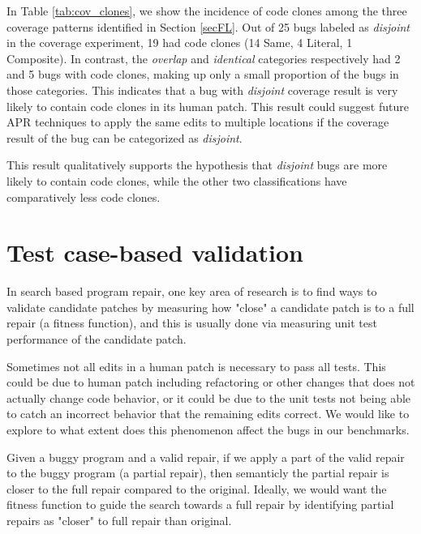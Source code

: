 \documentclass[sigconf, timestamp-false, anonymous=true]{acmart}
\newcommand\todo[1]{\textcolor{red}{#1}}
\begin{document}
In Table \ref{tab:cov_clones}, we show the incidence of code clones among the three 
coverage patterns identified in Section \ref{secFL}. Out of 25 bugs labeled as 
\emph{disjoint} in the coverage 
experiment, 19 had code clones (14 Same, 4 Literal, 1 Composite). In contrast, the 
\emph{overlap} and \emph{identical} categories respectively had 2 and 5 bugs with code clones, 
making up only a small proportion of the bugs in those categories. This indicates that a 
bug with \emph{disjoint} coverage result is very likely to contain code clones in its
human patch. This result could suggest future APR techniques to apply the same edits to multiple locations
if the coverage result of the bug can be categorized as \emph{disjoint}.

This result qualitatively supports the hypothesis that \emph{disjoint} bugs are more likely to contain code 
clones, while the other two classifications have comparatively less code clones.



\section{Test case-based validation}

In search based program repair, one key area of research is to find ways to validate
candidate patches by
measuring how "close" a candidate patch is to a full repair (a fitness function),
and this is usually done via measuring unit test performance of the candidate patch. 


Sometimes not all edits in a human patch is necessary to pass all tests. This could be
due to human patch including refactoring or other changes that does not actually
change code behavior, or it could be due to the unit tests not being able to catch
an incorrect behavior that the remaining edits correct. We would like to explore
to what extent does this phenomenon affect the bugs in our benchmarks.


Given a buggy program and a valid repair, if we apply a part of the valid repair to 
the buggy program (a partial repair), then semanticly the partial repair is closer
 to the full repair compared to the original. 
Ideally, we would want the fitness function to guide the search towards a full 
repair by identifying partial repairs as "closer" to full repair than original.
\end{document}
